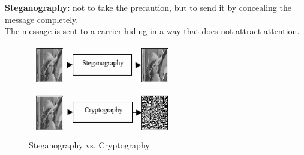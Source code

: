 \documentclass[12pt,hyperref={unicode}]{beamer}
\begin{document}
\begin{frame}
\textbf{Steganography:} not to take the precaution, but to send it by concealing the message completely.\\ 
The message is sent to a carrier hiding in a way that does not attract attention.\\
\begin{figure}[h]
\includegraphics[width=7cm, height=4cm]{stego & kripto.png}
\caption{Steganography vs. Cryptography}
\end{figure}
\end{frame}



\end{document}
